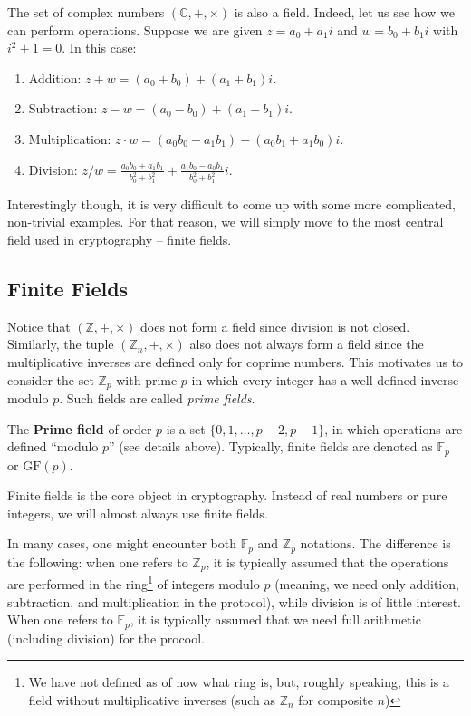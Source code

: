 \documentclass[../lecture-notes-148x210.tex]{subfiles}
\begin{document}
\begin{example}
    The set of complex numbers $(\mathbb{C}, +, \times)$ is also a field. Indeed, let us see how we can perform 
    operations. Suppose we are given $z = a_0 + a_1i$ and $w = b_0 + b_1i$ with $i^2+1=0$. In this case:
    \begin{enumerate}
        \item Addition: $z + w = (a_0 + b_0) + (a_1 + b_1)i$.
        \item Subtraction: $z - w = (a_0 - b_0) + (a_1 - b_1)i$.
        \item Multiplication: $z \cdot w = (a_0b_0 - a_1b_1) + (a_0b_1 + a_1b_0)i$.
        \item Division: $z / w = \frac{a_0b_0 + a_1b_1}{b_0^2 + b_1^2} + \frac{a_1b_0 - a_0b_1}{b_0^2 + b_1^2}i$.
    \end{enumerate}
\end{example}

Interestingly though, it is very difficult to come up with some more complicated, non-trivial examples. For that 
reason, we will simply move to the most central field used in cryptography -- finite fields.

\subsection{Finite Fields}
Notice that $(\mathbb{Z},+,\times)$ does not form a field since division is not
closed. Similarly, the tuple $(\mathbb{Z}_n,+,\times)$ also does not always form
a field since the multiplicative inverses are defined only for coprime numbers.
This motivates us to consider the set $\mathbb{Z}_p$ with prime $p$ in which
every integer has a well-defined inverse modulo $p$. Such fields are called
\textit{prime fields}. 

\begin{definition}
    The \textbf{Prime field} of order $p$ is a set $\{0,1,\dots,p-2,p-1\}$, in
    which operations are defined ``modulo $p$'' (see details above). Typically,
    finite fields are denoted as $\mathbb{F}_p$ or $\text{GF}(p)$.
\end{definition}

Finite fields is the core object in cryptography. Instead of real numbers or pure integers, we will almost always 
use finite fields.

\begin{remark}
    In many cases, one might encounter both $\mathbb{F}_p$ and $\mathbb{Z}_p$ notations. The difference is the 
    following: when one refers to $\mathbb{Z}_p$, it is typically assumed that the operations are performed in 
    the ring\footnote{We have not defined as of now what ring is, but, roughly speaking, this is a field without 
    multiplicative inverses (such as $\mathbb{Z}_n$ for composite $n$)} of integers modulo $p$ (meaning, we need only addition, subtraction, and multiplication 
    in the protocol), while division is of little interest. When one refers to $\mathbb{F}_p$, it is typically 
    assumed that we need full arithmetic (including division) for the procool.
\end{remark}
\end{document}
